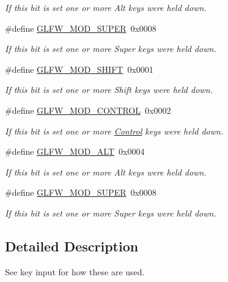 \begin{DoxyCompactItemize}
\begin{DoxyCompactList}\small\item\em If this bit is set one or more Alt keys were held down. \end{DoxyCompactList}\item 
\mbox{\label{group__mods_ga6b64ba10ea0227cf6f42efd0a220aba1}} 
\#define \hyperlink{group__mods_ga6b64ba10ea0227cf6f42efd0a220aba1}{G\+L\+F\+W\+\_\+\+M\+O\+D\+\_\+\+S\+U\+P\+ER}~0x0008
\begin{DoxyCompactList}\small\item\em If this bit is set one or more Super keys were held down. \end{DoxyCompactList}\item 
\mbox{\label{group__mods_ga14994d3196c290aaa347248e51740274}} 
\#define \hyperlink{group__mods_ga14994d3196c290aaa347248e51740274}{G\+L\+F\+W\+\_\+\+M\+O\+D\+\_\+\+S\+H\+I\+FT}~0x0001
\begin{DoxyCompactList}\small\item\em If this bit is set one or more Shift keys were held down. \end{DoxyCompactList}\item 
\mbox{\label{group__mods_ga6ed94871c3208eefd85713fa929d45aa}} 
\#define \hyperlink{group__mods_ga6ed94871c3208eefd85713fa929d45aa}{G\+L\+F\+W\+\_\+\+M\+O\+D\+\_\+\+C\+O\+N\+T\+R\+OL}~0x0002
\begin{DoxyCompactList}\small\item\em If this bit is set one or more \hyperlink{classControl}{Control} keys were held down. \end{DoxyCompactList}\item 
\mbox{\label{group__mods_gad2acd5633463c29e07008687ea73c0f4}} 
\#define \hyperlink{group__mods_gad2acd5633463c29e07008687ea73c0f4}{G\+L\+F\+W\+\_\+\+M\+O\+D\+\_\+\+A\+LT}~0x0004
\begin{DoxyCompactList}\small\item\em If this bit is set one or more Alt keys were held down. \end{DoxyCompactList}\item 
\mbox{\label{group__mods_ga6b64ba10ea0227cf6f42efd0a220aba1}} 
\#define \hyperlink{group__mods_ga6b64ba10ea0227cf6f42efd0a220aba1}{G\+L\+F\+W\+\_\+\+M\+O\+D\+\_\+\+S\+U\+P\+ER}~0x0008
\begin{DoxyCompactList}\small\item\em If this bit is set one or more Super keys were held down. \end{DoxyCompactList}\end{DoxyCompactItemize}


\subsection{Detailed Description}
See key input for how these are used. 
